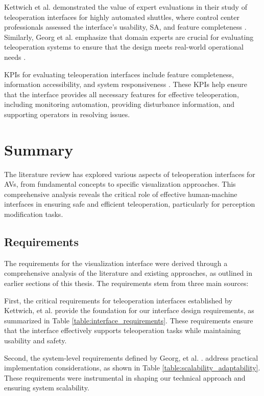 Kettwich et al. demonstrated the value of expert evaluations in their study of teleoperation interfaces for highly automated shuttles, where control center professionals assessed the interface's usability, \ac{SA}, and feature completeness \cite{Kettwich}. Similarly, Georg et al. emphasize that domain experts are crucial for evaluating teleoperation systems to ensure that the design meets real-world operational needs \cite{Georg}.

\acp{KPI} for evaluating teleoperation interfaces include feature completeness, information accessibility, and system responsiveness \cite{Brecht}. These \acp{KPI} help ensure that the interface provides all necessary features for effective teleoperation, including monitoring automation, providing disturbance information, and supporting operators in resolving issues.

\section{Summary}
The literature review has explored various aspects of teleoperation interfaces for \acp{AV}, from fundamental concepts to specific visualization approaches. This comprehensive analysis reveals the critical role of effective human-machine interfaces in ensuring safe and efficient teleoperation, particularly for perception modification tasks.
\subsection{Requirements}

The requirements for the visualization interface were derived through a comprehensive analysis of the literature and existing approaches, as outlined in earlier sections of this thesis. The requirements stem from three main sources:

First, the critical requirements for teleoperation interfaces established by Kettwich, et al. \cite{Kettwich} provide the foundation for our interface design requirements, as summarized in Table \ref{table:interface_requirements}. These requirements ensure that the interface effectively supports teleoperation tasks while maintaining usability and safety.

Second, the system-level requirements defined by Georg, et al. \cite{Georg}. address practical implementation considerations, as shown in Table \ref{table:scalability_adaptability}. These requirements were instrumental in shaping our technical approach and ensuring system scalability.

